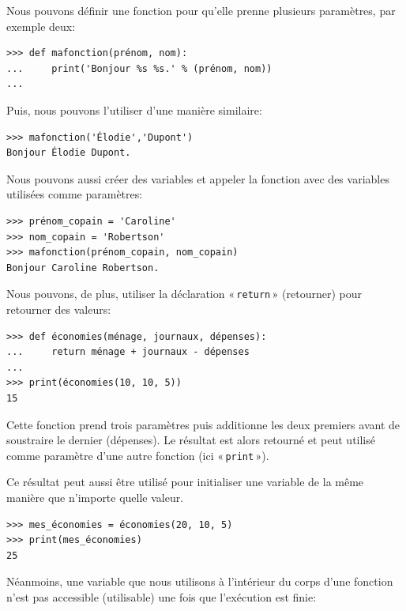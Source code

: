 Nous pouvons définir une fonction pour qu'elle prenne plusieurs paramètres, par exemple deux:

\begin{Verbatim}[frame=single,rulecolor=\color{mbleu}, label=à taper]
>>> def mafonction(prénom, nom):
...     print('Bonjour %s %s.' % (prénom, nom))
...
\end{Verbatim}

Puis, nous pouvons l'utiliser d'une manière similaire:

\begin{Verbatim}[frame=single,rulecolor=\color{mbleu}, label=à taper]
>>> mafonction('Élodie','Dupont')
Bonjour Élodie Dupont.
\end{Verbatim}

Nous pouvons aussi créer des variables et appeler la fonction avec des variables utilisées comme paramètres:

\begin{Verbatim}[frame=single,rulecolor=\color{mbleu}, label=à taper]
>>> prénom_copain = 'Caroline'
>>> nom_copain = 'Robertson'
>>> mafonction(prénom_copain, nom_copain)
Bonjour Caroline Robertson.
\end{Verbatim}

Nous pouvons, de plus, utiliser la déclaration « \texttt{return} » (retourner) pour retourner des valeurs:

\begin{Verbatim}[frame=single,rulecolor=\color{mbleu}, label=à taper]
>>> def économies(ménage, journaux, dépenses):
...     return ménage + journaux - dépenses
...
>>> print(économies(10, 10, 5))
15
\end{Verbatim}

Cette fonction prend trois paramètres puis additionne les deux premiers avant de soustraire le dernier (dépenses). Le résultat est alors retourné et peut utilisé comme paramètre d'une autre fonction (ici « \texttt{print} »).

Ce résultat peut aussi être utilisé pour initialiser une variable de la même manière que n'importe quelle valeur.

\begin{Verbatim}[frame=single,rulecolor=\color{mbleu}, label=à taper]
>>> mes_économies = économies(20, 10, 5)
>>> print(mes_économies)
25
\end{Verbatim}

Néanmoins, une variable que nous utilisons à l'intérieur du corps d'une fonction n'est pas accessible (utilisable) une fois que l'exécution est finie:

